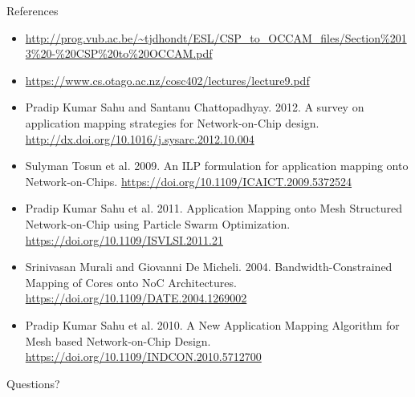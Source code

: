 \documentclass{beamer}
\begin{document}
\begingroup
\tiny
\begin{frame}{References}
	\begin{itemize}
		\item \url{http://prog.vub.ac.be/~tjdhondt/ESL/CSP_to_OCCAM_files/Section\%2013\%20-\%20CSP\%20to\%20OCCAM.pdf}
		\item \url{https://www.cs.otago.ac.nz/cosc402/lectures/lecture9.pdf}
		\item Pradip Kumar Sahu and Santanu Chattopadhyay. 2012. A survey on application mapping strategies for Network-on-Chip design. \url{http://dx.doi.org/10.1016/j.sysarc.2012.10.004}
		\item Sulyman Tosun et al. 2009. An ILP formulation for application mapping onto Network-on-Chips. \url{https://doi.org/10.1109/ICAICT.2009.5372524}
		\item Pradip Kumar Sahu et al. 2011. Application Mapping onto Mesh Structured Network-on-Chip using Particle Swarm Optimization. \url{https://doi.org/10.1109/ISVLSI.2011.21}
		\item Srinivasan Murali and Giovanni De Micheli. 2004. Bandwidth-Constrained Mapping of Cores onto NoC Architectures. \url{https://doi.org/10.1109/DATE.2004.1269002}
		\item Pradip Kumar Sahu et al. 2010. A New Application Mapping Algorithm for Mesh based Network-on-Chip Design. \url{https://doi.org/10.1109/INDCON.2010.5712700}
	\end{itemize}
\end{frame}
\endgroup

\begin{frame}{Questions?}
\end{frame}
\end{document}
